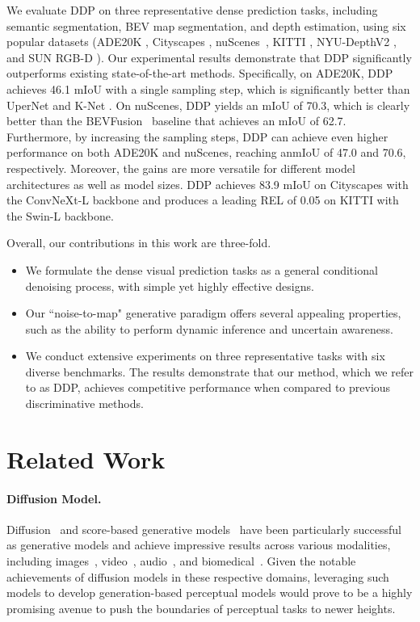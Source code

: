 \documentclass[10pt,twocolumn,letterpaper]{article}
\newcommand{\ours}[0]{DDP\xspace}
\begin{document}
We evaluate \ours on three representative dense prediction tasks, including semantic segmentation, BEV map segmentation, and depth estimation, using six popular datasets (ADE20K \cite{zhou2017scene}, Cityscapes \cite{Cordts_2016_CVPR}, nuScenes~\cite{caesar2020nuscenes}, KITTI \cite{geiger2013vision}, NYU-DepthV2 \cite{silberman2012indoor}, and SUN RGB-D \cite{song2015sun}).
Our experimental results demonstrate that DDP significantly outperforms existing state-of-the-art methods. Specifically, on ADE20K, DDP achieves 46.1 mIoU with a single sampling step, which is significantly better than UperNet \cite{xiao2018unified} and K-Net \cite{zhang2021k}. On nuScenes, DDP yields an mIoU of 70.3, which is clearly better than the BEVFusion~\cite{liu2022bevfusion} baseline that achieves an mIoU of 62.7.
Furthermore, by increasing the sampling steps, DDP can achieve even higher performance on both ADE20K and nuScenes, reaching anmIoU of 47.0 and 70.6, respectively. 
Moreover, the gains are more versatile for different model architectures as well as model sizes. \ours achieves 83.9 mIoU on Cityscapes with the ConvNeXt-L backbone and produces a leading REL of 0.05 on KITTI with the Swin-L backbone.

Overall, our contributions in this work are three-fold. 
\begin{itemize}
  \item We formulate the dense visual prediction tasks as a general conditional denoising process, with simple yet highly effective designs.
  \item Our ``noise-to-map" generative paradigm offers several appealing properties, such as the ability to perform dynamic inference and uncertain awareness.
  \item We conduct extensive experiments on three representative tasks with six diverse benchmarks. The results demonstrate that our method, which we refer to as \ours, achieves competitive performance when compared to previous discriminative methods.
\end{itemize}
 \section{Related Work}

\paragraph{Diffusion Model.}
Diffusion~\cite{ho2020denoising, sohl2015deep} and score-based generative models~\cite{songdenoising} have been particularly successful as generative models and achieve impressive results across various modalities, including images~\cite{ramesh2022hierarchical,saharia2022image,dhariwal2021diffusion,nichol2021glide,daras2022multiresolution,daras2022multiresolution}, video~\cite{ho2022video,hong2022cogvideo}, audio~\cite{kolesnikov2020big}, and biomedical~\cite{anand2022protein, trippe2022diffusion,schneuing2022structure,corso2022diffdock}.
Given the notable achievements of diffusion models in these respective domains, leveraging such models to develop generation-based perceptual models would prove to be a highly promising avenue to push the boundaries of perceptual tasks to newer heights.
\end{document}
